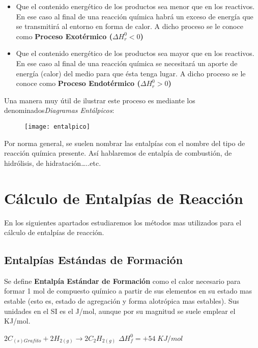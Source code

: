 \begin{itemize}
	\item Que el contenido energético de los productos sea menor que en los reactivos. En ese caso al final de una reacción química habrá un exceso de energía que se transmitirá al entorno en forma de calor. A dicho proceso se le conoce como \textbf{Proceso Exotérmico ($\Delta H^{0}_r < 0$)}\\
	
	\item Que el contenido energético de los productos sea mayor que en los reactivos. En ese caso al final de una reacción química se necesitará un aporte de energía (calor) del medio para que ésta tenga lugar. A dicho proceso se le conoce como \textbf{Proceso Endotérmico ($\Delta H^{0}_r > 0$)}\\
\end{itemize}

Una manera muy útil de ilustrar este proceso es mediante los denominados\emph{Diagramas Entálpicos}:

\begin{figure}[h!]
	\centering
	\texttt{[image: entalpico]}
\end{figure}

Por norma general, se suelen nombrar las entalpías con el nombre del tipo de reacción química presente. Así hablaremos de entalpía de combustión, de hidrólisis, de hidratación…..etc.

\section{Cálculo de Entalpías de Reacción}

En los siguientes apartados estudiaremos los métodos mas utilizados para el cálculo de entalpías de reacción.

\subsection{Entalpías Estándas de Formación}

Se define \textbf{Entalpía Estándar de Formación} como el calor necesario para formar 1 mol de compuesto químico a partir de sus elementos en su estado mas estable (esto es, estado de agregación y forma alotrópica mas estables). Sus unidades en el SI es el J/mol, aunque por su magnitud se suele emplear el KJ/mol.

\begin{center}
	$2C_{(s)Grafito}+2H_{2(g)} \longrightarrow 2C_2H_{2(g)}$ \hspace{1cm} $\Delta H^{0}_f = +54\; KJ/mol$ 
\end{center}

